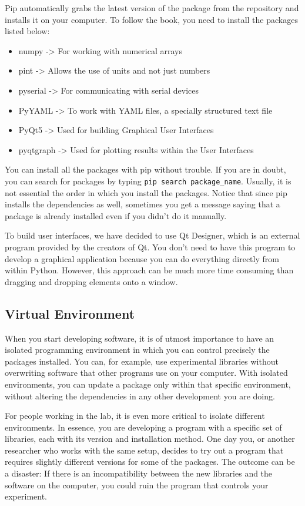 Pip automatically grabs the latest version of the package from the repository and installs it on your computer. To follow the book, you need to install the packages listed below:
\begin{itemize}
 \item numpy -> For working with numerical arrays
 \item pint -> Allows the use of units and not just numbers
 \item pyserial -> For communicating with serial devices
 \item PyYAML -> To work with YAML files, a specially structured text file
 \item PyQt5 -> Used for building Graphical User Interfaces
 \item pyqtgraph -> Used for plotting results within the User Interfaces
\end{itemize}

You can install all the packages with pip without trouble. If you are in doubt, you can search for packages by typing \texttt{pip search package_name}. Usually, it is not essential the order in which you install the packages. Notice that since pip installs the dependencies as well, sometimes you get a message saying that a package is already installed even if you didn't do it manually.

To build user interfaces, we have decided to use Qt Designer, which is an external program provided by the creators of Qt. You don't need to have this program to develop a graphical application because you can do everything directly from within Python. However, this approach can be much more time consuming than dragging and dropping elements onto a window.

\subsection{Virtual Environment}\label{subsec:virtual-environment2}
When you start developing software, it is of utmost importance to have an isolated programming environment in which you can control precisely the packages installed. You can, for example, use experimental libraries without overwriting software that other programs use on your computer. With isolated environments, you can update a package only within that specific environment, without altering the dependencies in any other development you are doing.

For people working in the lab, it is even more critical to isolate different environments. In essence, you are developing a program with a specific set of libraries, each with its version and installation method. One day you, or another researcher who works with the same setup, decides to try out a program that requires slightly different versions for some of the packages. The outcome can be a disaster: If there is an incompatibility between the new libraries and the software on the computer, you could ruin the program that controls your experiment.


